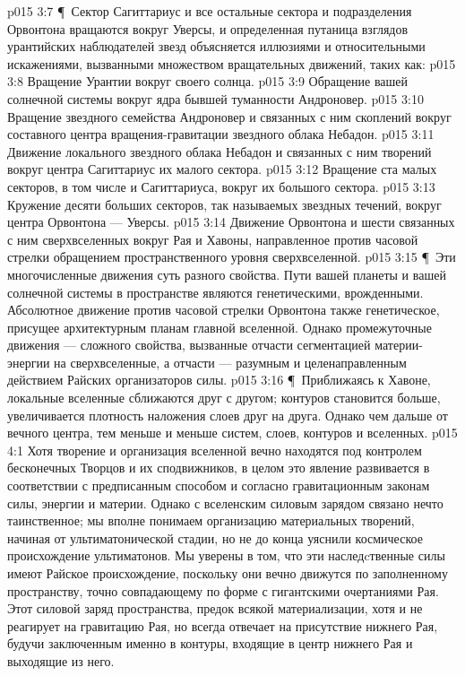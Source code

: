 \vs p015 3:7 \P\ Сектор Сагиттариус и все остальные сектора и подразделения Орвонтона вращаются вокруг Уверсы, и определенная путаница взглядов урантийских наблюдателей звезд объясняется иллюзиями и относительными искажениями, вызванными множеством вращательных движений, таких как:
\vs p015 3:8 \bibnobreakspace Вращение Урантии вокруг своего солнца.
\vs p015 3:9 \bibnobreakspace Обращение вашей солнечной системы вокруг ядра бывшей туманности Андроновер.
\vs p015 3:10 \bibnobreakspace Вращение звездного семейства Андроновер и связанных с ним скоплений вокруг составного центра вращения\hyp{}гравитации звездного облака Небадон.
\vs p015 3:11 \bibnobreakspace Движение локального звездного облака Небадон и связанных с ним творений вокруг центра Сагиттариус их малого сектора.
\vs p015 3:12 \bibnobreakspace Вращение ста малых секторов, в том числе и Сагиттариуса, вокруг их большого сектора.
\vs p015 3:13 \bibnobreakspace Кружение десяти больших секторов, так называемых звездных течений, вокруг центра Орвонтона --- Уверсы.
\vs p015 3:14 \bibnobreakspace Движение Орвонтона и шести связанных с ним сверхвселенных вокруг Рая и Хавоны, направленное против часовой стрелки обращением пространственного уровня сверхвселенной.
\vs p015 3:15 \P\ Эти многочисленные движения суть разного свойства. Пути вашей планеты и вашей солнечной системы в пространстве являются генетическими, врожденными. Абсолютное движение против часовой стрелки Орвонтона также генетическое, присущее архитектурным планам главной вселенной. Однако промежуточные движения --- сложного свойства, вызванные отчасти сегментацией материи\hyp{}энергии на сверхвселенные, а отчасти --- разумным и целенаправленным действием Райских организаторов силы.
\vs p015 3:16 \P\ Приближаясь к Хавоне, локальные вселенные сближаются друг с другом; контуров становится больше, увеличивается плотность наложения слоев друг на друга. Однако чем дальше от вечного центра, тем меньше и меньше систем, слоев, контуров и вселенных.
\vs p015 4:1 Хотя творение и организация вселенной вечно находятся под контролем бесконечных Творцов и их сподвижников, в целом это явление развивается в соответствии с предписанным способом и согласно гравитационным законам силы, энергии и материи. Однако с вселенским силовым зарядом связано нечто таинственное; мы вполне понимаем организацию материальных творений, начиная от ультиматонической стадии, но не до конца уяснили космическое происхождение ультиматонов. Мы уверены в том, что эти наследcтвенные силы имеют Райское происхождение, поскольку они вечно движутся по заполненному пространству, точно совпадающему по форме с гигантскими очертаниями Рая. Этот силовой заряд пространства, предок всякой материализации, хотя и не реагирует на гравитацию Рая, но всегда отвечает на присутствие нижнего Рая, будучи заключенным именно в контуры, входящие в центр нижнего Рая и выходящие из него.
